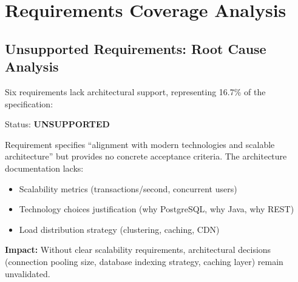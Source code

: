 \documentclass[11pt,a4paper]{article}
\begin{document}
\section{Requirements Coverage Analysis}

\subsection{Unsupported Requirements: Root Cause Analysis}

Six requirements lack architectural support, representing 16.7\% of the specification:

\begin{tcolorbox}[colback=criticalred!5,colframe=criticalred,title=\textbf{REQ-8: Scalability and Modern Technologies}]
Status: \textbf{UNSUPPORTED}

Requirement specifies ``alignment with modern technologies and scalable architecture'' but provides no concrete acceptance criteria. The architecture documentation lacks:
\begin{itemize}
    \item Scalability metrics (transactions/second, concurrent users)
    \item Technology choices justification (why PostgreSQL, why Java, why REST)
    \item Load distribution strategy (clustering, caching, CDN)
\end{itemize}

\textbf{Impact:} Without clear scalability requirements, architectural decisions (connection pooling size, database indexing strategy, caching layer) remain unvalidated.
\end{tcolorbox}
\end{document}
